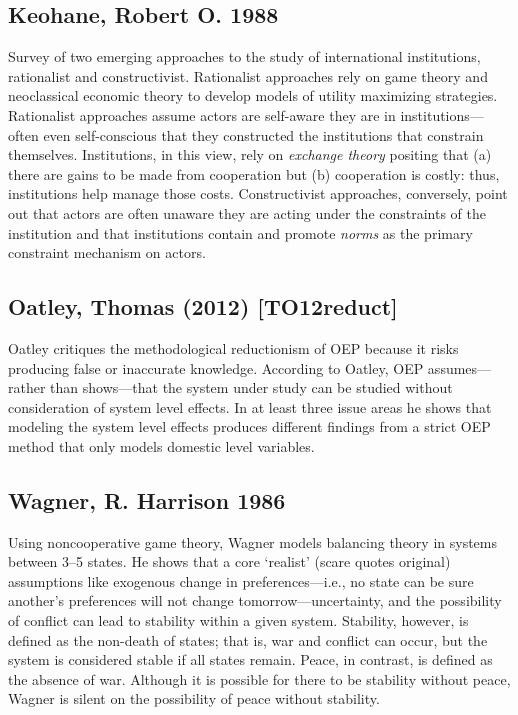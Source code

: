 \documentclass[11pt]{article}
\begin{document}
\subsection{Keohane, Robert O. 1988}
\label{sec-6-5}
Survey of two emerging approaches to the study of international
institutions, rationalist and constructivist. Rationalist approaches
rely on game theory and neoclassical economic theory to develop models
of utility maximizing strategies. Rationalist approaches assume actors
are self-aware they are in institutions---often even self-conscious
that they constructed the institutions that constrain
themselves. Institutions, in this view, rely on \emph{exchange theory}
positing that (a) there are gains to be made from cooperation but (b)
cooperation is costly: thus, institutions help manage those
costs. Constructivist approaches, conversely, point out that actors
are often unaware they are acting under the constraints of the
institution and that institutions contain and promote \emph{norms} as the
primary constraint mechanism on actors. 
\subsection{Oatley, Thomas (2012) [TO12reduct]}
\label{sec-6-6}
Oatley critiques the methodological reductionism of OEP because it
risks producing false or inaccurate knowledge. According to Oatley,
OEP assumes---rather than shows---that the system under study can be
studied without consideration of system level effects. In at least
three issue areas he shows that modeling the system level effects
produces different findings from a strict OEP method that only models
domestic level variables. 
\subsection{Wagner, R. Harrison 1986}
\label{sec-6-7}
Using noncooperative game theory, Wagner models balancing theory in
systems between 3--5 states. He shows that a core `realist' (scare
quotes original) assumptions like exogenous change in
preferences---i.e., no state can be sure another's preferences will
not change tomorrow---uncertainty, and the possibility of conflict can
lead to stability within a given system. Stability, however, is
defined as the non-death of states; that is, war and conflict can
occur, but the system is considered stable if all states
remain. Peace, in contrast, is defined as the absence of war. Although
it is possible for there to be stability without peace, Wagner is
silent on the possibility of peace without stability. 
\end{document}
